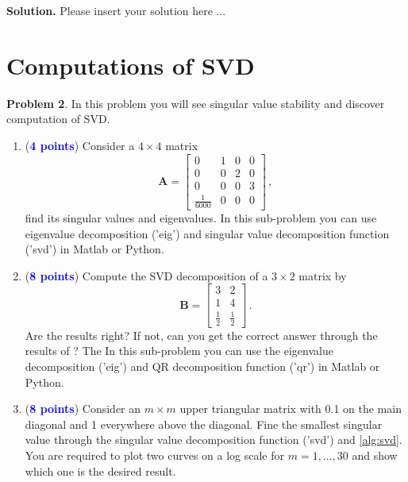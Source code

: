 \documentclass[english,onecolumn]{IEEEtran}
\begin{document}
\noindent
\textbf{Solution.}
Please insert your solution here ...


\newpage
\section{Computations of SVD}
\noindent\textbf{Problem 2}.
In this problem you will see singular value stability and discover computation of SVD.
\begin{enumerate}
    \item (\textcolor{blue}{\textbf{4 points}}) Consider a $4 \times 4$ matrix
    \[
	\mathbf{A} = \begin{bmatrix}
		0& 1&0&0 \\
		0&0&2&0\\
		0&0&0&3\\
		\frac{1}{6000}&0&0&0
	\end{bmatrix}\,,
	\]
	find its singular values and eigenvalues. In this sub-problem you can use eigenvalue decomposition ('eig') and singular value decomposition function ('svd') in Matlab or Python.
	\item (\textcolor{blue}{\textbf{8 points}}) Compute the SVD decomposition of a $3 \times 2$ matrix by 
	\[
	\mathbf{B} = \begin{bmatrix}
		3& 2 \\
		1&4  \\
		\frac{1}{2}&\frac{1}{2}
	\end{bmatrix}\,.
	\]
Are the results right? If not, can you get the correct answer through the results of ? The In this sub-problem you can use the eigenvalue decomposition ('eig') and QR decomposition function ('qr') in Matlab or Python.
\item (\textcolor{blue}{\textbf{8 points}}) Consider an $m\times m$ upper triangular matrix with 0.1 on the main diagonal and 1 everywhere above the diagonal. Fine the smallest singular value through the singular value decomposition function ('svd') and \cref{alg:svd}. You are required to plot two curves on a log scale for $m=1,\dots,30$ and show which one is the desired result.
\end{enumerate}
\end{document}
